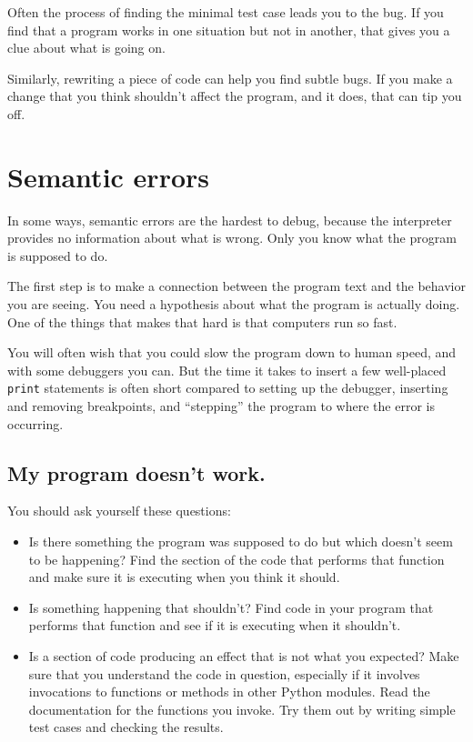\documentclass[10pt]{book}
\begin{document}

Often the process of finding the minimal test case leads you to the
bug.  If you find that a program works in one situation but not in
another, that gives you a clue about what is going on.

Similarly, rewriting a piece of code can help you find subtle
bugs.  If you make a change that you think shouldn't affect the
program, and it does, that can tip you off.


\section{Semantic errors}

In some ways, semantic errors are the hardest to debug,
because the interpreter provides no information
about what is wrong.  Only you know what the program is supposed to
do.

The first step is to make a connection between the program
text and the behavior you are seeing.  You need a hypothesis
about what the program is actually doing.  One of the things
that makes that hard is that computers run so fast.

You will often wish that you could slow the program down to human
speed, and with some debuggers you can.  But the time it takes to
insert a few well-placed {\tt print} statements is often short compared to
setting up the debugger, inserting and removing breakpoints, and
``stepping'' the program to where the error is occurring.

\subsection{My program doesn't work.}

You should ask yourself these questions:

\begin{itemize}

\item Is there something the program was supposed to do but
which doesn't seem to be happening?  Find the section of the code
that performs that function and make sure it is executing when
you think it should.

\item Is something happening that shouldn't?  Find code in
your program that performs that function and see if it is
executing when it shouldn't.

\item Is a section of code producing an effect that is not
what you expected?  Make sure that you understand the code in
question, especially if it involves invocations to functions or methods in
other Python modules.  Read the documentation for the functions you invoke.
Try them out by writing simple test cases and checking the results.

\end{itemize}
\end{document}
